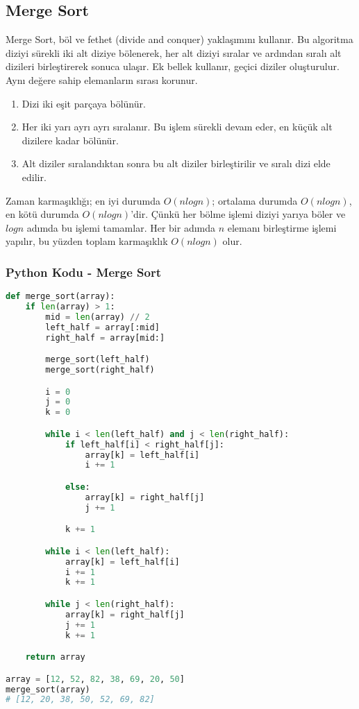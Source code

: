 \newpage

\subsection{Merge Sort}

Merge Sort, böl ve fethet (divide and conquer) yaklaşımını kullanır. Bu algoritma diziyi sürekli iki alt diziye bölenerek, her alt diziyi sıralar ve ardından sıralı alt dizileri birleştirerek sonuca ulaşır. Ek bellek kullanır, geçici diziler oluşturulur. Aynı değere sahip elemanların sırası korunur.

\begin{enumerate}
    \item Dizi iki eşit parçaya bölünür.
    \item Her iki yarı ayrı ayrı sıralanır. Bu işlem sürekli devam eder, en küçük alt dizilere kadar bölünür.
    \item Alt diziler sıralandıktan sonra bu alt diziler birleştirilir ve sıralı dizi elde edilir.
\end{enumerate}

Zaman karmaşıklığı; en iyi durumda $O(nlogn)$; ortalama durumda $O(nlogn)$, en kötü durumda $O(nlogn)$'dir. Çünkü her bölme işlemi diziyi yarıya böler ve $logn$ adımda bu işlemi tamamlar. Her bir adımda $n$ elemanı birleştirme işlemi yapılır, bu yüzden toplam karmaşıklık $O(nlogn)$ olur.

\subsubsection{Python Kodu - Merge Sort}

\begin{lstlisting}[language=Python]
def merge_sort(array):
    if len(array) > 1:
        mid = len(array) // 2
        left_half = array[:mid]
        right_half = array[mid:]

        merge_sort(left_half)
        merge_sort(right_half)

        i = 0
        j = 0
        k = 0

        while i < len(left_half) and j < len(right_half):
            if left_half[i] < right_half[j]:
                array[k] = left_half[i]
                i += 1

            else:
                array[k] = right_half[j]
                j += 1

            k += 1

        while i < len(left_half):
            array[k] = left_half[i]
            i += 1
            k += 1

        while j < len(right_half):
            array[k] = right_half[j]
            j += 1
            k += 1

    return array

array = [12, 52, 82, 38, 69, 20, 50]
merge_sort(array)
# [12, 20, 38, 50, 52, 69, 82]
\end{lstlisting}

